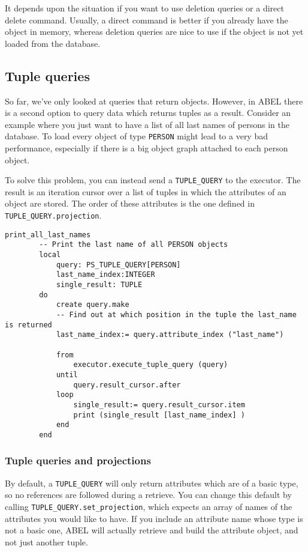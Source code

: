 It depends upon the situation if you want to use deletion queries or a direct delete command. 
Usually, a direct command is better if you already have the object in memory, whereas deletion queries are nice to use if the object is not yet loaded from the database.

\subsection{Tuple queries}

So far, we've only looked at queries that return objects. However, in ABEL there is a second option to query data which returns tuples as a result.
Consider an example where you just want to have a list of all last names of persons in the database. 
To load every object of type \lstinline!PERSON! might lead to a very bad performance, especially if there is a big object graph attached to each person object.

To solve this problem, you can instead send a \lstinline!TUPLE_QUERY! to the executor. 
The result is an iteration cursor over a list of tuples in which the attributes of an object are stored. The order of these attributes is the one defined in \lstinline!TUPLE_QUERY.projection!.

\begin{lstlisting}[language=OOSC2Eiffel, captionpos=b, caption={}, label={lst:tuple_query_simple}]
	print_all_last_names
		-- Print the last name of all PERSON objects
		local
			query: PS_TUPLE_QUERY[PERSON]
			last_name_index:INTEGER
			single_result: TUPLE
		do
			create query.make
			-- Find out at which position in the tuple the last_name is returned
			last_name_index:= query.attribute_index ("last_name")

			from
				executor.execute_tuple_query (query)
			until
				query.result_cursor.after
			loop
				single_result:= query.result_cursor.item
				print (single_result [last_name_index] )
			end			
		end
\end{lstlisting}

\subsubsection{Tuple queries and projections}
By default, a \lstinline!TUPLE_QUERY! will only return attributes which are of a basic type, so no references are followed during a retrieve.
You can change this default by calling \lstinline!TUPLE_QUERY.set_projection!, which expects an array of names of the attributes you would like to have.
If you include an attribute name whose type is not a basic one, ABEL will actually retrieve and build the attribute object, and not just another tuple.

